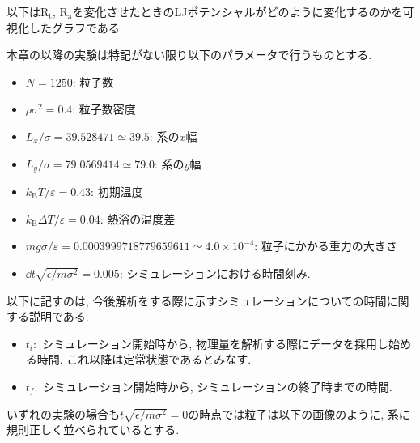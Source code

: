 以下は$\text{R}_\text{t}$, $\text{R}_\text{a}$を変化させたときのLJポテンシャルがどのように変化するのかを可視化したグラフである.



本章の以降の実験は特記がない限り以下のパラメータで行うものとする. 

\begin{itemize}
  \item $N = 1250$: 粒子数
  \item $\rho {\sigma}^2 = 0.4$: 粒子数密度
  \item $L_x / \sigma = 39.528471 \simeq 39.5$: 系の$x$幅
  \item $L_y / \sigma = 79.0569414 \simeq 79.0$: 系の$y$幅
  \item $k_{\text{B}} T / \varepsilon = 0.43$: 初期温度
  \item $k_{\text{B}} \Delta T / \varepsilon = 0.04$: 熱浴の温度差
  \item $mg\sigma/\varepsilon = 0.0003999718779659611 \simeq 4.0 \times 10^{-4}$: 粒子にかかる重力の大きさ
  \item $\dd t \sqrt{\epsilon/m{\sigma}^2} = 0.005$: シミュレーションにおける時間刻み.
\end{itemize}


以下に記すのは, 今後解析をする際に示すシミュレーションについての時間に関する説明である.

\begin{itemize}
  \item $t_i \colon$ シミュレーション開始時から, 物理量を解析する際にデータを採用し始める時間. これ以降は定常状態であるとみなす.
  \item $t_f \colon$ シミュレーション開始時から, シミュレーションの終了時までの時間.
\end{itemize}

いずれの実験の場合も$t\sqrt{\epsilon/m{\sigma}^2}=0$の時点では粒子は以下の画像のように, 系に規則正しく並べられているとする.

